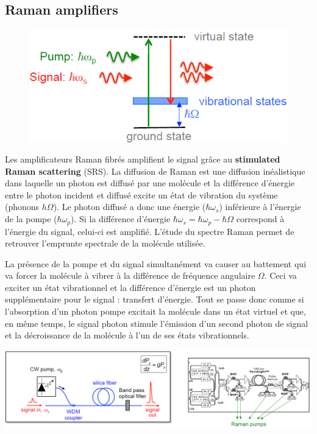 \subsection{Raman amplifiers}
	\begin{figure}
	\vspace{3mm}
	\includegraphics[scale=0.55]{ch6/image18}
	\end{figure}
Les amplificateurs Raman fibrés amplifient le signal grâce au \textbf{stimulated Raman scattering} (SRS).
La diffusion de Raman est une diffusion inéalistique dans laquelle un photon est diffusé par une molécule  et
la différence d'énergie entre le photon incident et diffusé excite un état de vibration du système (phonons 
$h\Omega$). Le photon diffusé a donc une énergie ($\hbar\omega_s$) inférieure à l'énergie de la pompe ($\hbar
\omega_p$). Si la différence d'énergie $\hbar\omega_s=\hbar\omega_p-\hbar\Omega$ correspond à l'énergie du signal, celui-ci est amplifié. 
L'étude du spectre Raman permet de retrouver l'emprunte spectrale de la molécule utilisée. 

\newpage

La présence de la pompe et du signal simultanément va causer au battement qui va forcer la molécule à 
vibrer à la différence de fréquence angulaire $\Omega$. Ceci va exciter un état vibrationnel et la différence
d'énergie est un photon supplémentaire pour le signal : transfert d'énergie. Tout se passe donc comme si
l'absorption d'un photon pompe excitait la molécule dans un état virtuel et que, en même temps, le signal photon 
stimule l'émission d'un second photon de signal et la décroissance de la molécule à l'un de ses états 
vibrationnels.

\begin{center}
	\includegraphics[scale=0.4]{ch6/image19}
\end{center}

